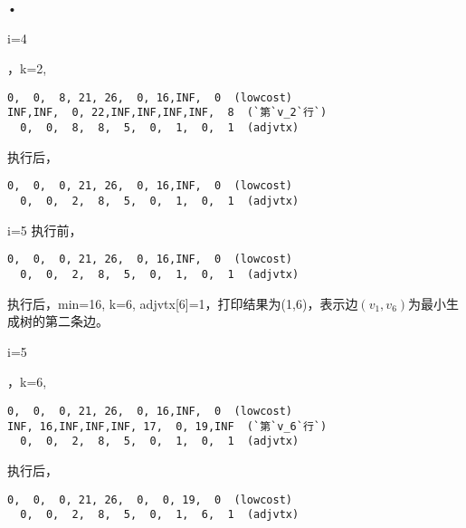 \begin{frame}\ft{\subsubsecname}
\begin{figure}

\end{figure}•
\end{frame}


\begin{frame}[fragile]\ft{\subsubsecname}
\tf i=4

，k=2,  
\begin{lstlisting}[xleftmargin=2em]
  0,  0,  8, 21, 26,  0, 16,INF,  0  (lowcost)
INF,INF,  0, 22,INF,INF,INF,INF,  8  (`第`v_2`行`)
  0,  0,  8,  8,  5,  0,  1,  0,  1  (adjvtx)
\end{lstlisting}  
执行后，
\begin{lstlisting}[xleftmargin=2em]
  0,  0,  0, 21, 26,  0, 16,INF,  0  (lowcost)
  0,  0,  2,  8,  5,  0,  1,  0,  1  (adjvtx)
\end{lstlisting}
\end{frame}


\begin{frame}[fragile]\ft{\subsubsecname}
\tf i=5 
执行前，
\begin{lstlisting}[xleftmargin=2em]
  0,  0,  0, 21, 26,  0, 16,INF,  0  (lowcost)
  0,  0,  2,  8,  5,  0,  1,  0,  1  (adjvtx)
\end{lstlisting} %
执行后，min=16, k=6, adjvtx[6]=1，打印结果为(1,6)，表示边$(v_1,v_6)$为最小生成树的第二条边。
\end{frame}


\begin{frame}\ft{\subsubsecname}
\begin{figure}

\end{figure}
\end{frame}

\begin{frame}[fragile]\ft{\subsubsecname}
\tf i=5 

，k=6,  
\begin{lstlisting}[xleftmargin=2em]
  0,  0,  0, 21, 26,  0, 16,INF,  0  (lowcost)
INF, 16,INF,INF,INF, 17,  0, 19,INF  (`第`v_6`行`)
  0,  0,  2,  8,  5,  0,  1,  0,  1  (adjvtx)
\end{lstlisting}  
执行后，
\begin{lstlisting}[xleftmargin=2em]
  0,  0,  0, 21, 26,  0,  0, 19,  0  (lowcost)
  0,  0,  2,  8,  5,  0,  1,  6,  1  (adjvtx)
\end{lstlisting}
\end{frame}


